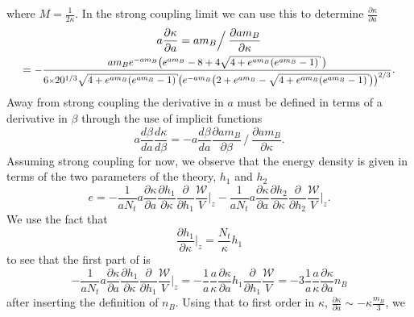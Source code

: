 %
where $M = \frac{1}{2 \kappa}$. In the strong coupling limit we can use this
to determine $\frac{\partial \kappa}{\partial a}$
%
\begin{multline}
  a \frac{\partial \kappa}{\partial a} = a m_B \Big/
    \:\frac{\partial a m_B}{\partial \kappa} \\
  = \scalemath{0.9}{%
    -\frac{%
        a m_B e^{-a m_B} \big( e^{a m_B} - 8 + 4 \sqrt{4 + e^{a m_B} (e^{a m_B} - 1)} \,\big)%
      }{%
        6 \scalemath{0.8}{\times} 20^{1/3} \sqrt{4 + e^{a m_B} (e^{a m_B} - 1)}
        \big(e^{-a m_B} \big( 2 + e^{a m_B} - \sqrt{4 + e^{a m_B} (e^{a m_B} - 1)} \big) \big)^{2/3}
      }}.
\end{multline}
%
Away from strong coupling the derivative in $a$ must be defined in terms of a
derivative in $\beta$ through the use of implicit functions
%
\begin{equation}
  a \frac{d \beta}{d a} \frac{d \kappa}{d \beta} = - a \frac{d \beta}{d a}
  \frac{\partial a m_B}{\partial \beta} \,\Big/ \:
  \frac{\partial a m_B}{\partial \kappa}.
\end{equation}
%
Assuming strong coupling for now, we observe that the energy density is given in
terms of the two parameters of the theory, $h_1$ and $h_2$
%
\begin{equation} \label{eq:energy_dens_mid_calc}
  e =  -\frac{1}{a N_t} a\frac{\partial \kappa}{\partial a}
    \frac{\partial h_1}{\partial \kappa} \frac{\partial}{\partial h_1}
    \frac{\mathcal{W}}{V} \bigg|_z
  -\frac{1}{a N_t} a\frac{\partial \kappa}{\partial a}
    \frac{\partial h_2}{\partial \kappa} \frac{\partial}{\partial h_2}
    \frac{\mathcal{W}}{V} \bigg|_z.
\end{equation}
%
We use the fact that
%
\begin{equation}
  \frac{\partial h_1}{\partial \kappa} \bigg|_z = \frac{N_t}{\kappa} h_1
\end{equation}
%
to see that the first part of  is
%
\begin{equation}
  -\frac{1}{a N_t} a\frac{\partial \kappa}{\partial a}
    \frac{\partial h_1}{\partial \kappa} \frac{\partial}{\partial h_1}
    \frac{\mathcal{W}}{V} \bigg|_z
  = - \frac{1}{a} \frac{a}{\kappa} \frac{\partial \kappa}{\partial a} h_1
  \frac{\partial}{\partial h_1} \frac{\mathcal{W}}{V}
  = -3 \frac{1}{a} \frac{a}{\kappa} \frac{\partial \kappa}{\partial a} n_B
\end{equation}
%
after inserting the definition of $n_B$. Using that to first order in $\kappa$,
$\frac{\partial \kappa}{\partial a} \sim \minus{}\kappa \frac{m_B}{3}$, we
